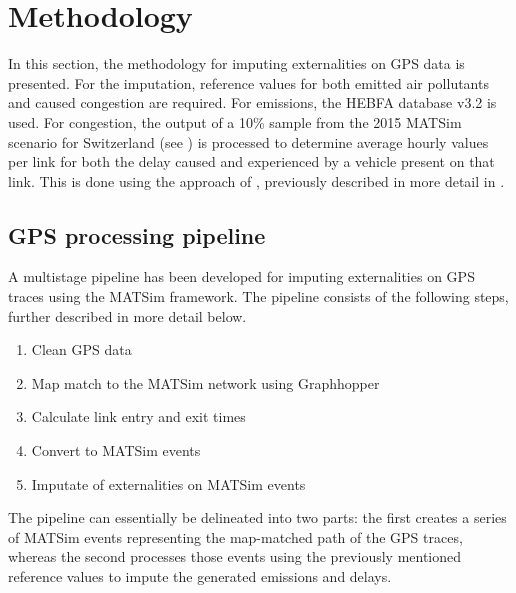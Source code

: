 \section{Methodology}

In this section, the methodology for imputing externalities on GPS data is presented.
For the imputation, reference values for both emitted air pollutants and caused congestion are required.
For emissions, the HEBFA database v3.2 is used.
For congestion, the output of a 10\% sample from the 2015 MATSim scenario for Switzerland (see ) is processed to determine average hourly values per link for both the delay caused and experienced by a vehicle present on that link.
This is done using the approach of \citet{kaddoura2015marginal}, previously described in more detail in .

\subsection{GPS processing pipeline}

A multistage pipeline has been developed for imputing externalities on GPS traces using the MATSim framework.
The pipeline consists of the following steps, further described in more detail below.

\begin{enumerate}
 	\item Clean GPS data
 	\item Map match to the MATSim network using Graphhopper
 	\item Calculate link entry and exit times
 	\item Convert to MATSim events
	\item Imputate of externalities on MATSim events
\end{enumerate}

The pipeline can essentially be delineated into two parts: the first creates a series of MATSim events representing the map-matched path of the GPS traces, whereas the second processes those events using the previously mentioned reference values to impute the generated emissions and delays.

